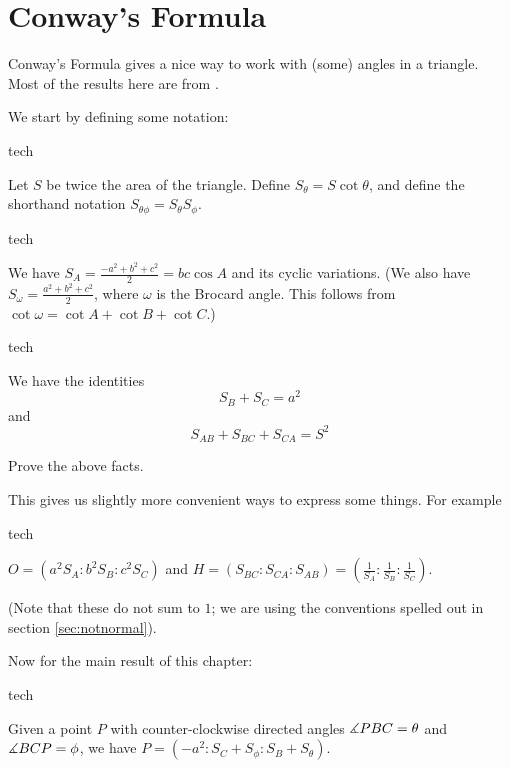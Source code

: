 \section{Conway's Formula}
\label{sec:conway}
Conway's Formula gives a nice way to work with (some) angles in a triangle.  Most of the results here are from \cite{spanish}.

We start by defining some notation:

\begin{StoreCode}{tech}
\begin{definition}
  \label{tech:conwaydef}
  Let $S$ be twice the area of the triangle.  Define $S_{\theta}=S\cot{\theta}$, and define the shorthand notation $S_{\theta\phi}=S_{\theta}S_{\phi}$.
\end{definition}
\end{StoreCode}

\begin{StoreCode}{tech}
\begin{fact}
We have $S_A=\frac{-a^2+b^2+c^2}{2}=bc\cos{A}$ and its cyclic variations.  (We also have $S_{\omega}=\frac{a^2+b^2+c^2}{2}$, where $\omega$ is the Brocard angle.  This follows from $\cot{\omega}=\cot{A}+\cot{B}+\cot{C}$.)
\end{fact}
\end{StoreCode}

\begin{StoreCode}{tech}
\begin{fact}
  We have the identities \[S_B + S_C = a^2 \] and \[ S_{AB}+S_{BC}+S_{CA}=S^2 \]
\end{fact}
\end{StoreCode}
\begin{exercise}
  Prove the above facts.
\end{exercise}

This gives us slightly more convenient ways to express some things.  For example

\begin{StoreCode}{tech}
\begin{fact}
  $O=(a^2S_A : b^2S_B : c^2S_C)$ and $H=(S_{BC} : S_{CA} : S_{AB}) = \left( \frac{1}{S_A} : \frac{1}{S_B} : \frac{1}{S_C} \right)$.
\end{fact}
\end{StoreCode}

(Note that these do not sum to $1$; we are using the conventions spelled out in section \ref{sec:notnormal}).

Now for the main result of this chapter:
\begin{StoreCode}{tech}
\begin{theorem}
  \label{tech:conwayformula}
   Given a point $P$ with counter-clockwise directed angles $\measuredangle PBC=\theta$ and $\measuredangle BCP=\phi$, we have $P=(-a^2 : S_C+S_\phi : S_B+S_\theta)$.
\end{theorem}
\end{StoreCode}

